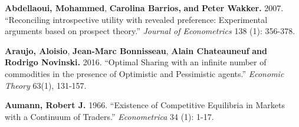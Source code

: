 \documentclass[pdftex]{article}
\numberwithin{equation}{section}
\theoremstyle{th}
\newtheorem{proof lemma}{{Proof Lemma}.}
\theoremstyle{definition}
\begin{document}
{%

\begin{thebibliography}{}


\textbf{Abdellaoui, Mohammed}, \textbf{Carolina Barrios,} \textbf{and} \textbf{Peter Wakker.} 2007. ``{Reconciling introspective utility with revealed preference: Experimental arguments based on prospect theory.}'' \emph{Journal of Econometrics} 138 ({1}): 356-378.




\textbf{Araujo, Aloisio}, \textbf{Jean-Marc Bonnisseau}, \textbf{Alain Chateauneuf} \textbf{and} \textbf{Rodrigo Novinski.} 2016. ``{Optimal Sharing with an infinite number of commodities in the presence of Optimistic and Pessimistic agents.}'' \emph{Economic Theory} 63(1), 131-157.



\textbf{Aumann, Robert J.} 1966.  ``{Existence of Competitive Equilibria in Markets with a Continuum of Traders.}'' \emph{Econometrica} 34 ({1}): 1-17.



\end{thebibliography}}
\end{document}
